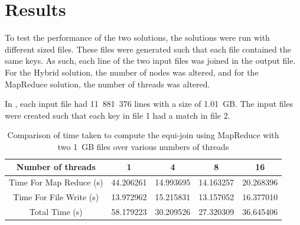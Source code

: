 \documentclass[10pt,twocolumn]{witseiepaper}
\begin{document}
%
%

\section{Results}
To test the performance of the two solutions, the solutions were run with different sized files. These files were generated such that each file contained the same keys. As such, each line of the two input files was joined in the output file. For the Hybrid solution, the number of nodes was altered, and for the MapReduce solution, the number of threads was altered.

In , each input file had 11~881~376 lines with a size of 1.01~GB. The input files were created such that each key in file 1 had a match in file 2.

\begin{table} [t]
	\centering
	\caption{Comparison of time taken to compute the equi-join using MapReduce with two 1~GB files over various numbers of threads}
	\label{tab:results2}
	
	\begin{tabular}{|c|c|c|c|c|}
		\hline 
		Number of threads & 1 & 4 & 8 &16\\ 
		\hline
		\hline
		Time For Map Reduce (s) & 44.206261 & 14.993695 & 14.163257 &20.268396\\ 
		\hline 
		Time For File Write (s) & 13.972962 & 15.215831 & 13.157052 &16.377010\\ 
		\hline 
		Total Time (s) & 58.179223 & 30.209526 & 27.320309 &  36.645406\\ 
		\hline 
	\end{tabular} 
\end{table}
\end{document}
